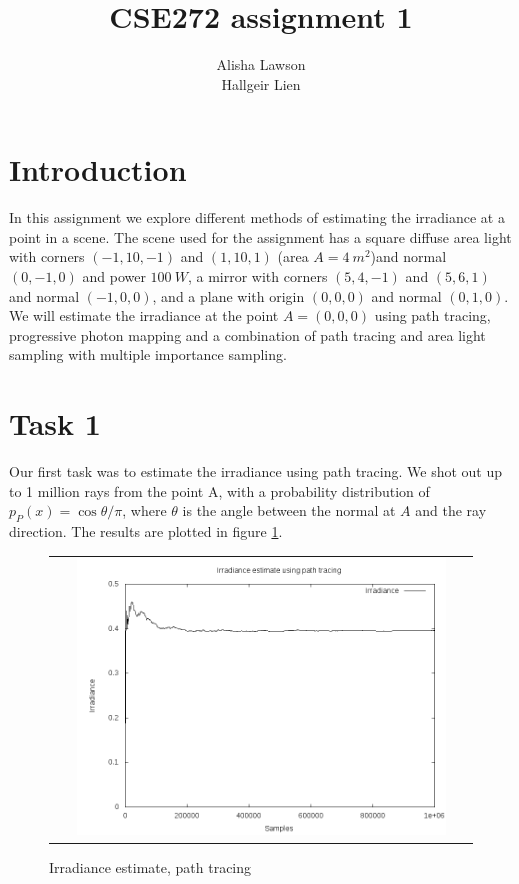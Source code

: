 \documentclass{article} %
\title{CSE272 assignment 1}
\author{Alisha Lawson\\Hallgeir Lien}
\date{}
\begin{document}
\maketitle
\newpage

\section{Introduction}
In this assignment we explore different methods of estimating the irradiance at a point in a scene. The scene used for the assignment has a square diffuse area light with corners $(-1,10,-1)$ and $(1,10,1)$ (area $A=4\ m^2$)and normal $(0,-1,0)$ and power $100\ W$, a mirror with corners $(5,4,-1)$ and $(5,6,1)$ and normal $(-1,0,0)$, and a plane with origin $(0,0,0)$ and normal $(0,1,0)$. We will estimate the irradiance at the point $A=(0,0,0)$ using path tracing, progressive photon mapping and a combination of path tracing and area light sampling with multiple importance sampling.

\section{Task 1}
Our first task was to estimate the irradiance using path tracing. We shot out up to 1 million rays from the point A, with a probability distribution of $p_P(x) = \cos \theta / \pi$, where $\theta$ is the angle between the normal at $A$ and the ray direction. The results are plotted in figure \ref{fig:pathtracing}. 
\begin{figure}[h]
\begin{tabular}{c}
\includegraphics[width=0.9\textwidth]{plots/irrad_pathtracing.png}\\
\end{tabular}
\caption{Irradiance estimate, path tracing}
\label{fig:pathtracing}
\end{figure}
\end{document}
